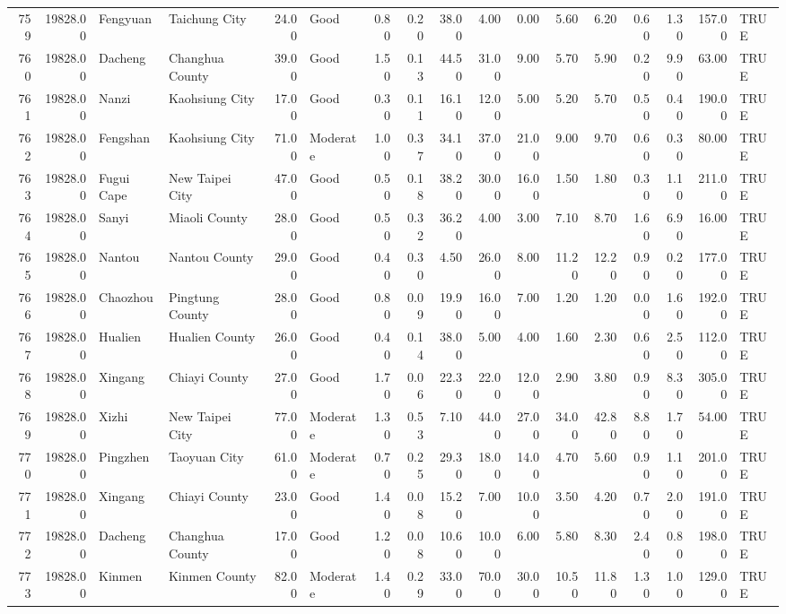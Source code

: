 \begin{table}[ht]
\begin{tabular}{rrllrlrrrrrrrrrrl}
  759 & 19828.00 & Fengyuan & Taichung City & 24.00 & Good & 0.80 & 0.20 & 38.00 & 4.00 & 0.00 & 5.60 & 6.20 & 0.60 & 1.30 & 157.00 & TRUE \\ 
  760 & 19828.00 & Dacheng & Changhua County & 39.00 & Good & 1.50 & 0.13 & 44.50 & 31.00 & 9.00 & 5.70 & 5.90 & 0.20 & 9.90 & 63.00 & TRUE \\ 
  761 & 19828.00 & Nanzi & Kaohsiung City & 17.00 & Good & 0.30 & 0.11 & 16.10 & 12.00 & 5.00 & 5.20 & 5.70 & 0.50 & 0.40 & 190.00 & TRUE \\ 
  762 & 19828.00 & Fengshan & Kaohsiung City & 71.00 & Moderate & 1.00 & 0.37 & 34.10 & 37.00 & 21.00 & 9.00 & 9.70 & 0.60 & 0.30 & 80.00 & TRUE \\ 
  763 & 19828.00 & Fugui Cape & New Taipei City & 47.00 & Good & 0.50 & 0.18 & 38.20 & 30.00 & 16.00 & 1.50 & 1.80 & 0.30 & 1.10 & 211.00 & TRUE \\ 
  764 & 19828.00 & Sanyi & Miaoli County & 28.00 & Good & 0.50 & 0.32 & 36.20 & 4.00 & 3.00 & 7.10 & 8.70 & 1.60 & 6.90 & 16.00 & TRUE \\ 
  765 & 19828.00 & Nantou & Nantou County & 29.00 & Good & 0.40 & 0.30 & 4.50 & 26.00 & 8.00 & 11.20 & 12.20 & 0.90 & 0.20 & 177.00 & TRUE \\ 
  766 & 19828.00 & Chaozhou & Pingtung County & 28.00 & Good & 0.80 & 0.09 & 19.90 & 16.00 & 7.00 & 1.20 & 1.20 & 0.00 & 1.60 & 192.00 & TRUE \\ 
  767 & 19828.00 & Hualien & Hualien County & 26.00 & Good & 0.40 & 0.14 & 38.00 & 5.00 & 4.00 & 1.60 & 2.30 & 0.60 & 2.50 & 112.00 & TRUE \\ 
  768 & 19828.00 & Xingang & Chiayi County & 27.00 & Good & 1.70 & 0.06 & 22.30 & 22.00 & 12.00 & 2.90 & 3.80 & 0.90 & 8.30 & 305.00 & TRUE \\ 
  769 & 19828.00 & Xizhi & New Taipei City & 77.00 & Moderate & 1.30 & 0.53 & 7.10 & 44.00 & 27.00 & 34.00 & 42.80 & 8.80 & 1.70 & 54.00 & TRUE \\ 
  770 & 19828.00 & Pingzhen & Taoyuan City & 61.00 & Moderate & 0.70 & 0.25 & 29.30 & 18.00 & 14.00 & 4.70 & 5.60 & 0.90 & 1.10 & 201.00 & TRUE \\ 
  771 & 19828.00 & Xingang & Chiayi County & 23.00 & Good & 1.40 & 0.08 & 15.20 & 7.00 & 10.00 & 3.50 & 4.20 & 0.70 & 2.00 & 191.00 & TRUE \\ 
  772 & 19828.00 & Dacheng & Changhua County & 17.00 & Good & 1.20 & 0.08 & 10.60 & 10.00 & 6.00 & 5.80 & 8.30 & 2.40 & 0.80 & 198.00 & TRUE \\ 
  773 & 19828.00 & Kinmen & Kinmen County & 82.00 & Moderate & 1.40 & 0.29 & 33.00 & 70.00 & 30.00 & 10.50 & 11.80 & 1.30 & 1.00 & 129.00 & TRUE \\ 

\end{tabular}
\end{table}
